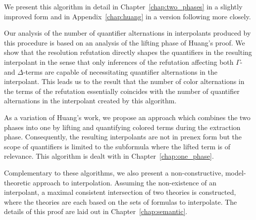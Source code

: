 We present this algorithm in detail in Chapter~\ref{chap:two_phases} in a slightly improved form and in Appendix~\ref{chap:huang} in a version following \cite{Huang95} more closely. 


Our analysis of the number of quantifier alternations in interpolants produced by this procedure is based on an analysis of the lifting phase of Huang's proof.
We show that the resolution refutation directly shapes the quantifiers in the resulting interpolant 
in the sense that only inferences of the refutation affecting both $\Gamma$-and $\Delta$-terms are capable of necessitating quantifier alternations in the interpolant.
This leads us to the result that 
the number of color alternations in the terms of the refutation essentially coincides with the number of quantifier alternations in the interpolant created by this algorithm.





As a variation of Huang's work, we propose an approach which combines the two phases into one 
by lifting and quantifying colored terms during the extraction phase. 
Consequently, the resulting interpolants are not in prenex form but the scope of quantifiers is limited to the subformula where the lifted term is of relevance.
This algorithm is dealt with in Chapter~\ref{chap:one_phase}.

Complementary to these algorithms, we also present a non-constructive, model-theoretic approach to interpolation.
Assuming the non-existence of an interpolant, a maximal consistent intersection of two theories is constructed, where the theories are each based on the sets of formulas to interpolate. The details of this proof are laid out in Chapter~\ref{chap:semantic}.


